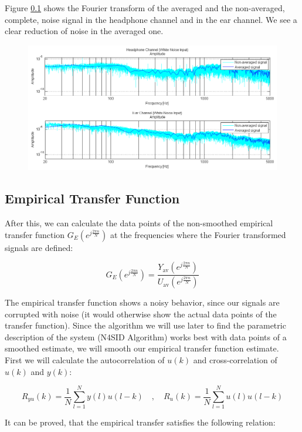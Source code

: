 Figure \ref{} shows the Fourier transform of the averaged and the non-averaged, complete, noise signal in the headphone channel and in the ear channel. We see a clear reduction of noise in the averaged one.

\begin{figure}[H]
\centering
\includegraphics[width=1.0\textwidth]{pics/averagedvsnonaveraged}
\caption{}
\label{pic:}
\end{figure}


\subsection{Empirical Transfer Function}
After this, we can calculate the data points of the non-smoothed empirical transfer function $G_E(e^{j\frac{2\pi n}{N}})$ at the frequencies where the Fourier transformed signals are defined:

\[G_E(e^{j\frac{2\pi n}{N}}) = \frac{Y_\text{av}(e^{j\frac{2\pi n}{N}})}{U_\text{av}(e^{j\frac{2\pi n}{N}})}\]


The empirical transfer function shows a noisy behavior, since our signals are corrupted with noise (it would otherwise show the actual data points of the transfer function). Since the algorithm we will use later to find the parametric description of the system (N4SID Algorithm) works best with data points of a smoothed estimate, we will smooth our empirical transfer function estimate.\\

First we will calculate the autocorrelation of $u(k)$ and cross-correlation of $u(k)$ and $y(k)$:

\[R_{yu}(k) = \frac{1}{N}\sum\limits_{l = 1}^N y(l)u(l-k) \quad , \quad R_{u}(k) = \frac{1}{N}\sum\limits_{l = 1}^N u(l)u(l-k)\]

It can be proved, that the empirical transfer satisfies the following relation: 

